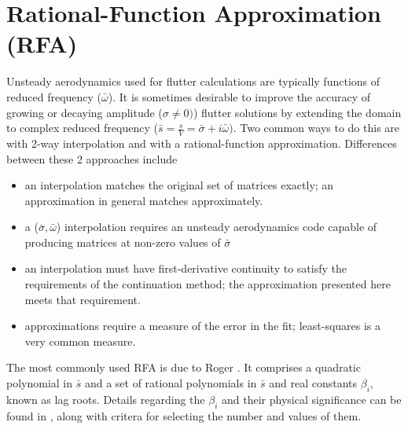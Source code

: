 \documentclass[10pt,openany,twoside]{book}
\numberwithin{equation}{section}   %
\newcommand{\Cmd}[1]{{\sf #1}}
\newcommand{\Newterm}[1]{{\em #1}}
\begin{document}
\newpage
\section{Rational-Function Approximation (RFA)}\label{chap:RFA}
Unsteady aerodynamics used for flutter calculations are typically
functions of reduced frequency ($\bar{\omega}$). It is sometimes desirable
to improve the accuracy of growing or decaying amplitude ($\sigma \ne 0)$)
flutter solutions by extending the domain to complex reduced frequency
($\bar{s} = \frac{s}{V} = \bar{\sigma} + i\bar{\omega})$.
Two common ways to do this are with 2-way interpolation and
with a rational-function approximation. Differences between
these 2 approaches include
\begin{itemize}
	\item an interpolation matches the original set of matrices
		exactly; an approximation in general matches approximately.
	\item a ($\bar{\sigma}, \bar{\omega}$) interpolation requires
		an unsteady aerodynamics code capable of producing matrices
		at non-zero values of $\bar{\sigma}$ \cite{edwards2008flutter}
	\item an interpolation must have first-derivative continuity
		to satisfy the requirements of the continuation method; the
		approximation presented here meets that requirement.
	\item approximations require a measure of the error in the
		fit; least-squares is a very common measure.
\end{itemize}

The most commonly used RFA is due to Roger \cite{roger1977airplane}.
It comprises a quadratic polynomial in $\bar{s}$ and a set of rational
polynomials in $\bar{s}$ and real constants $\beta_i$, known as
lag roots. Details regarding the $\beta_i$ and their physical
significance can be found in \cite{demasi2024introduction}, along
with critera for selecting the number and values of them.
\end{document}
